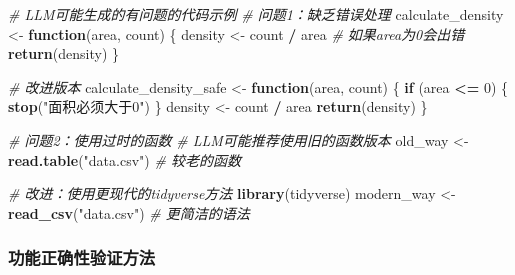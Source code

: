 \documentclass[
]{book}
\newenvironment{Shaded}{\begin{snugshade}}{\end{snugshade}}
\newcommand{\CommentTok}[1]{\textcolor[rgb]{0.56,0.35,0.01}{\textit{#1}}}
\newcommand{\ControlFlowTok}[1]{\textcolor[rgb]{0.13,0.29,0.53}{\textbf{#1}}}
\newcommand{\DecValTok}[1]{\textcolor[rgb]{0.00,0.00,0.81}{#1}}
\newcommand{\FunctionTok}[1]{\textcolor[rgb]{0.13,0.29,0.53}{\textbf{#1}}}
\newcommand{\NormalTok}[1]{#1}
\newcommand{\OtherTok}[1]{\textcolor[rgb]{0.56,0.35,0.01}{#1}}
\newcommand{\SpecialCharTok}[1]{\textcolor[rgb]{0.81,0.36,0.00}{\textbf{#1}}}
\newcommand{\StringTok}[1]{\textcolor[rgb]{0.31,0.60,0.02}{#1}}
\begin{document}
\begin{Shaded}
\begin{Highlighting}[]
\CommentTok{\# LLM可能生成的有问题的代码示例}
\CommentTok{\# 问题1：缺乏错误处理}
\NormalTok{calculate\_density }\OtherTok{\textless{}{-}} \ControlFlowTok{function}\NormalTok{(area, count) \{}
\NormalTok{  density }\OtherTok{\textless{}{-}}\NormalTok{ count }\SpecialCharTok{/}\NormalTok{ area  }\CommentTok{\# 如果area为0会出错}
  \FunctionTok{return}\NormalTok{(density)}
\NormalTok{\}}

\CommentTok{\# 改进版本}
\NormalTok{calculate\_density\_safe }\OtherTok{\textless{}{-}} \ControlFlowTok{function}\NormalTok{(area, count) \{}
  \ControlFlowTok{if}\NormalTok{ (area }\SpecialCharTok{\textless{}=} \DecValTok{0}\NormalTok{) \{}
    \FunctionTok{stop}\NormalTok{(}\StringTok{"面积必须大于0"}\NormalTok{)}
\NormalTok{  \}}
\NormalTok{  density }\OtherTok{\textless{}{-}}\NormalTok{ count }\SpecialCharTok{/}\NormalTok{ area}
  \FunctionTok{return}\NormalTok{(density)}
\NormalTok{\}}

\CommentTok{\# 问题2：使用过时的函数}
\CommentTok{\# LLM可能推荐使用旧的函数版本}
\NormalTok{old\_way }\OtherTok{\textless{}{-}} \FunctionTok{read.table}\NormalTok{(}\StringTok{"data.csv"}\NormalTok{)  }\CommentTok{\# 较老的函数}

\CommentTok{\# 改进：使用更现代的tidyverse方法}
\FunctionTok{library}\NormalTok{(tidyverse)}
\NormalTok{modern\_way }\OtherTok{\textless{}{-}} \FunctionTok{read\_csv}\NormalTok{(}\StringTok{"data.csv"}\NormalTok{)  }\CommentTok{\# 更简洁的语法}
\end{Highlighting}
\end{Shaded}

\hypertarget{ux529fux80fdux6b63ux786eux6027ux9a8cux8bc1ux65b9ux6cd5}{%
\subsubsection{功能正确性验证方法}\label{ux529fux80fdux6b63ux786eux6027ux9a8cux8bc1ux65b9ux6cd5}}
\end{document}
